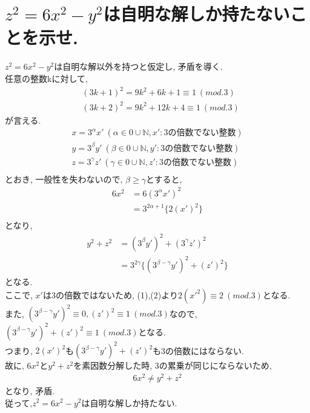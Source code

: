 \documentclass[uplatex]{jsarticle}
\begin{document}
    \newpage

    \section{$z^2=6x^2-y^2$は自明な解しか持たないことを示せ.}
    \noindent
    $z^2=6x^2-y^2$は自明な解以外を持つと仮定し, 矛盾を導く. \\
    任意の整数kに対して, \\
    \begin{eqnarray}
        & (3k+1)^2 = 9k^2 + 6k + 1  \equiv 1\ (mod.3) \\
        & (3k+2)^2 = 9k^2 + 12k + 4  \equiv 1\ (mod.3)
    \end{eqnarray}
    が言える. \\
    \begin{align*}
        x=3^\alpha x' \ (\alpha \in {0} \cup \mathbb{N}, x':3の倍数でない整数) \\
        y=3^\beta y' \ (\beta \in {0} \cup \mathbb{N}, y':3の倍数でない整数) \\
        z=3^\gamma z' \ (\gamma \in {0} \cup \mathbb{N}, z':3の倍数でない整数) \\
    \end{align*}
    とおき, 一般性を失わないので, $\beta \geq \gamma$とすると,
    \begin{align*}
        6x^2 &= 6(3^\alpha x')^2 \\
        &= 3^{2\alpha + 1}\{2(x')^2\} \\
    \end{align*}
    となり, 
    \begin{align*}
        y^2 + z^2 &= (3^{\beta}y')^2 + (3^{\gamma}z')^2 \\
        &= 3^{2\gamma} \{(3^{\beta - \gamma}y')^2 + (z')^2\}
    \end{align*}
    となる. \\
    ここで, $x'$は3の倍数ではないため, (1),(2)より$2(x'^2) \equiv 2\ (mod.3)$となる. \\
    また, $(3^{\beta - \gamma}y')^2 \equiv 0, (z')^2 \equiv 1\ (mod.3)$なので,
    $(3^{\beta - \gamma}y')^2 + (z')^2 \equiv 1\ (mod.3)$となる.\\
    つまり, $2(x')^2$も$(3^{\beta - \gamma}y')^2 + (z')^2$も3の倍数にはならない. \\
    故に, $6x^2$と$y^2+z^2$を素因数分解した時, 3の累乗が同じにならないため, 
    \begin{align*}
        6x^2 \neq y^2 + z^2 
    \end{align*}
    となり, 矛盾. \\
    \noindent
    従って,$z^2=6x^2-y^2$は自明な解しか持たない.
\end{document}
